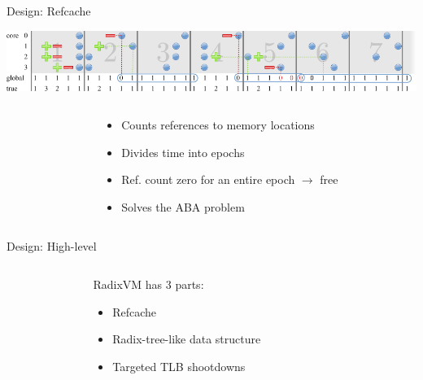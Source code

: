 \documentclass[aspectratio=169]{beamer}
\newcommand{\bi}{\begin{itemize}}
\newcommand{\ei}{\end{itemize}}
\begin{document}
\begin{frame}{Design: Refcache}
  \begin{center}
  \includegraphics[scale=0.9]{./figures/refcache.pdf}
  \end{center}
  \begin{columns}[T]
    \begin{column}{0.4\textwidth}
    \end{column}
    \begin{column}{0.6\textwidth}
      \bi
    \item Counts references to memory locations
    \item Divides time into epochs
    \item Ref. count zero for an entire epoch $\rightarrow$ free
    \item Solves the ABA problem
      \ei
    \end{column}
  \end{columns}
\end{frame}

\begin{frame}{Design: High-level}
  \begin{columns}[T]
    \begin{column}{0.3\textwidth}
    \end{column}
    \begin{column}{0.4\textwidth}
      RadixVM has 3 parts:
      \bi
    \item Refcache
    \item {Radix-tree-like data structure}
    \item Targeted TLB shootdowns
      \ei
    \end{column}
    \begin{column}{0.3\textwidth}
    \end{column}
  \end{columns}
\end{frame}
\end{document}
